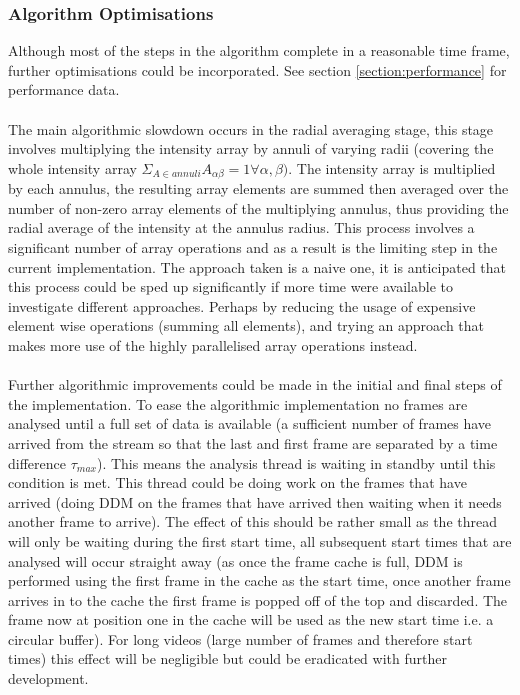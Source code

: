 \documentclass[11pt]{article}
\begin{document}
\subsubsection{Algorithm Optimisations}
Although most of the steps in the algorithm complete in a reasonable time frame, further optimisations could be incorporated. See section \ref{section:performance} for performance data. 
\\\\
The main algorithmic slowdown occurs in the radial averaging stage, this stage involves multiplying the intensity array by annuli of varying radii (covering the whole intensity array $\Sigma_{A \in annuli} A_{\alpha \beta} = 1 \forall \alpha, \beta)$. The intensity array is multiplied by each annulus, the resulting array elements are summed then averaged over the number of non-zero array elements of the multiplying annulus, thus providing the radial average of the intensity at the annulus radius. This process involves a significant number of array operations and as a result is the limiting step in the current implementation. The approach taken is a naive one, it is anticipated that this process could be sped up significantly if more time were available to investigate different approaches. Perhaps by reducing the usage of expensive element wise operations (summing all elements), and trying an approach that makes more use of the highly parallelised array operations instead.
\\\\
Further algorithmic improvements could be made in the initial and final steps of the implementation. To ease the algorithmic implementation no frames are analysed until a full set of data is available (a sufficient number of frames have arrived from the stream so that the last and first frame are separated by a time difference $\tau_{max}$). This means the analysis thread is waiting in standby until this condition is met. This thread could be doing work on the frames that have arrived (doing DDM on the frames that have arrived then waiting when it needs another frame to arrive). The effect of this should be rather small as the thread will only be waiting during the first start time, all subsequent start times that are analysed will occur straight away (as once the frame cache is full, DDM is performed using the first frame in the cache as the start time, once another frame arrives in to the cache the first frame is popped off of the top and discarded. The frame now at position one in the cache will be used as the new start time i.e. a circular buffer). For long videos (large number of frames and therefore start times) this effect will be negligible but could be eradicated with further development. 
\end{document}
